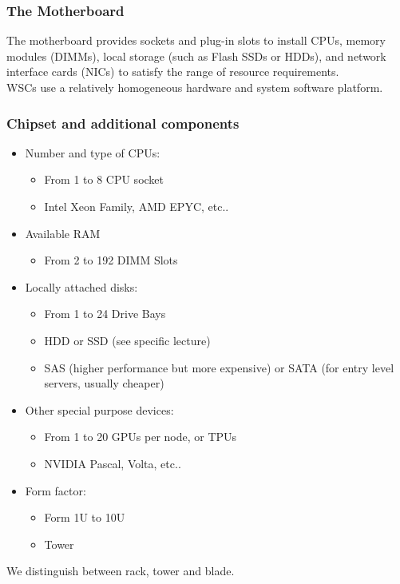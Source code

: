 \documentclass[10pt, oneside]{article}
\begin{document}
\subsubsection{The Motherboard}
The motherboard provides sockets and plug-in slots to install CPUs, memory modules (DIMMs), local storage (such as Flash SSDs or HDDs), and network interface cards (NICs) to satisfy the range of resource requirements.\\
\newline
WSCs use a relatively homogeneous hardware and
system software platform.
\newpage
\subsubsection{Chipset and additional components}
\begin{itemize}
    \item Number and type of CPUs:
\begin{itemize}
    \item From 1 to 8 CPU socket
    \item Intel Xeon Family, AMD EPYC, etc..
\end{itemize}
    \item Available RAM
    \begin{itemize}
        \item From 2 to 192 DIMM Slots
    \end{itemize}
    \item Locally attached disks:
    \begin{itemize}
        \item From 1 to 24 Drive Bays
        \item HDD or SSD (see specific lecture)
        \item SAS (higher performance but more expensive) or SATA (for entry level servers, usually cheaper)
    \end{itemize}
    \item Other special purpose devices:
    \begin{itemize}
        \item From 1 to 20 GPUs per node, or TPUs
        \item NVIDIA Pascal, Volta, etc..
    \end{itemize}
    \item Form factor:
    \begin{itemize}
        \item Form 1U to 10U
        \item Tower
    \end{itemize}
\end{itemize}
We distinguish between rack, tower and blade.\\
\newline
\end{document}
